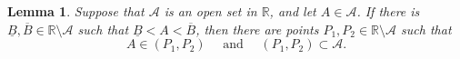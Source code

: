 \documentclass{amsart}
\newtheorem{lemma}[theorem]{Lemma}
\newcommand{\R}{\mathbb R}
\newcommand{\1}{\mathds{1}}
\newcommand{\cA}{\mathcal A}
\def \R {{\mathbb {R}}}
\numberwithin{equation}{section}
\numberwithin{theorem}{section}
\begin{document}
%	
%	

\begin{lemma}
Suppose that $\cA$ is an open set in $\R$, and let $A \in \cA$.  If there is $\underline B, \overline B \in \R\setminus \cA$ such that $\underline B < A < \overline B$, then there are points $P_1, P_2 \in \R\setminus \cA$ such that
\[
	A \in (P_1, P_2)
		\quad\text{ and }\quad
	(P_1, P_2) \subset \cA.
\]
\end{lemma}
\end{document}
